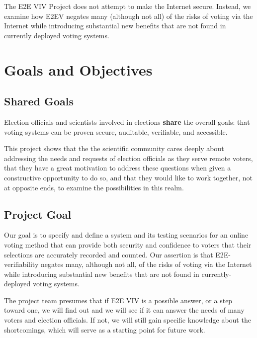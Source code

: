 The E2E VIV Project does not attempt to make the Internet
secure. Instead, we examine how E2EV negates many (although not all)
of the risks of voting via the Internet while introducing substantial
new benefits that are not found in currently deployed voting systems.

\section{Goals and Objectives}
\label{sec:goals-objectives}

\subsection{Shared Goals}
\label{sec:shared-goals}

Election officials and scientists involved in elections \textbf{share}
the overall goals: that voting systems can be proven secure,
auditable, verifiable, and accessible.

This project shows that the the scientific community cares deeply
about addressing the needs and requests of election officials as they
serve remote voters, that they have a great motivation to address
these questions when given a constructive opportunity to do so, and
that they would like to work together, not at opposite ends, to
examine the possibilities in this realm.

\subsection{Project Goal}
\label{sec:project-goal}

Our goal is to specify and define a system and its testing scenarios
for an online voting method that can provide both security and
confidence to voters that their selections are accurately recorded and
counted. Our assertion is that E2E-verifiability negates many,
although not all, of the risks of voting via the Internet while
introducing substantial new benefits that are not found in
currently-deployed voting systems.

The project team presumes that if E2E VIV is a possible answer, or a
step toward one, we will find out and we will see if it can answer the
needs of many voters and election officials. If not, we will still
gain specific knowledge about the shortcomings, which will serve as a
starting point for future work.

